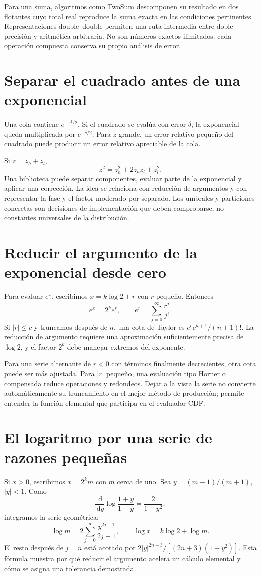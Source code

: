 \documentclass[11pt,a4paper]{article}
\newcommand{\dd}{\,\mathrm d}
\theoremstyle{definition}
\begin{document}
Para una suma, algoritmos como TwoSum descomponen su resultado en dos flotantes cuyo total real reproduce la suma exacta en las condiciones pertinentes.
Representaciones double--double permiten una ruta intermedia entre doble precisión y aritmética arbitraria.
No son números exactos ilimitados: cada operación compuesta conserva su propio análisis de error.

\section{Separar el cuadrado antes de una exponencial}
Una cola contiene $e^{-z^2/2}$.
Si el cuadrado se evalúa con error $\delta$, la exponencial queda multiplicada por $e^{-\delta/2}$.
Para $z$ grande, un error relativo pequeño del cuadrado puede producir un error relativo apreciable de la cola.

Si $z=z_h+z_l$,
\[
z^2=z_h^2+2z_hz_l+z_l^2.
\]
Una biblioteca puede separar componentes, evaluar parte de la exponencial y aplicar una corrección.
La idea se relaciona con reducción de argumentos y con representar la fase y el factor moderado por separado.
Los umbrales y particiones concretas son decisiones de implementación que deben comprobarse, no constantes universales de la distribución.

\section{Reducir el argumento de la exponencial desde cero}
Para evaluar $e^x$, escribimos $x=k\log2+r$ con $r$ pequeño.
Entonces
\[
e^x=2^ke^r,\qquad e^r=\sum_{j=0}^\infty\frac{r^j}{j!}.
\]
Si $|r|\le c$ y truncamos después de $n$,
una cota de Taylor es $e^c c^{n+1}/(n+1)!$.
La reducción de argumento requiere una aproximación suficientemente precisa de $\log2$, y el factor $2^k$ debe manejar extremos del exponente.

Para una serie alternante de $r<0$ con términos finalmente decrecientes, otra cota puede ser más ajustada.
Para $|r|$ pequeño, una evaluación tipo Horner o compensada reduce operaciones y redondeos.
Dejar a la vista la serie no convierte automáticamente su truncamiento en el mejor método de producción; permite entender la función elemental que participa en el evaluador CDF.

\section{El logaritmo por una serie de razones pequeñas}
Si $x>0$, escribimos $x=2^km$ con $m$ cerca de uno.
Sea $y=(m-1)/(m+1)$, $|y|<1$.
Como
\[
\frac{\dd}{\dd y}\log\frac{1+y}{1-y}=\frac2{1-y^2},
\]
integramos la serie geométrica:
\[
\log m=2\sum_{j=0}^\infty\frac{y^{2j+1}}{2j+1},\qquad
\log x=k\log2+\log m.
\]
El resto después de $j=n$ está acotado por
$2|y|^{2n+3}/[(2n+3)(1-y^2)]$.
Esta fórmula muestra por qué reducir el argumento acelera un cálculo elemental y cómo se asigna una tolerancia demostrada.
\end{document}
